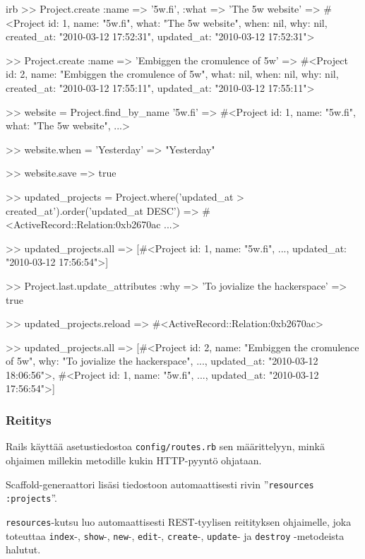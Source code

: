 \documentclass{article}
\newcommand{\pdfforeignlanguage}[2]{\texorpdfstring{\foreignlanguage{#1}{#2}}{#2}}
\newcommand{\eng}[1]{\pdfforeignlanguage{english}{#1}}
\begin{document}
\begin{pygmented}{irb}
>> Project.create :name => '5w.fi', :what => 'The 5w website'
=> #<Project id: 1,
             name: "5w.fi",
             what: "The 5w website",
             when: nil,
             why: nil,
             created_at: "2010-03-12 17:52:31",
             updated_at: "2010-03-12 17:52:31">

>> Project.create :name => 'Embiggen the cromulence of 5w'
=> #<Project id: 2,
             name: "Embiggen the cromulence of 5w",
             what: nil,
             when: nil,
             why: nil,
             created_at: "2010-03-12 17:55:11",
             updated_at: "2010-03-12 17:55:11">

>> website = Project.find_by_name '5w.fi'
=> #<Project id: 1, name: "5w.fi", what: "The 5w website", ...>

>> website.when = 'Yesterday'
=> "Yesterday"

>> website.save
=> true

>> updated_projects = Project.where('updated_at > created_at').order('updated_at DESC')
=> #<ActiveRecord::Relation:0xb2670ac ...>

>> updated_projects.all
=> [#<Project id: 1, name: "5w.fi", ..., updated_at: "2010-03-12 17:56:54">]

>> Project.last.update_attributes :why => 'To jovialize the hackerspace'
=> true

>> updated_projects.reload
=> #<ActiveRecord::Relation:0xb2670ac>

>> updated_projects.all
=> [#<Project id: 2, name: "Embiggen the cromulence of 5w",
              why: "To jovialize the hackerspace", ...,
              updated_at: "2010-03-12 18:06:56">,
    #<Project id: 1, name: "5w.fi", ..., updated_at: "2010-03-12 17:56:54">]
\end{pygmented}

\subsubsection{Reititys}
\label{sec:projects-routing}

Rails käyttää asetustiedostoa \texttt{config/routes.rb} sen määrittelyyn, minkä
ohjaimen millekin metodille kukin HTTP-pyyntö ohjataan.

\eng{Scaffold}-generaattori lisäsi tiedostoon automaattisesti rivin
''\texttt{resources :projects}''.

\texttt{resources}-kutsu luo automaattisesti REST-tyylisen reitityksen
ohjaimelle, joka toteuttaa \texttt{index}-, \texttt{show}-, \texttt{new}-,
\texttt{edit}-, \texttt{create}-, \texttt{update}- ja \texttt{destroy}
-metodeista halutut.
\end{document}
